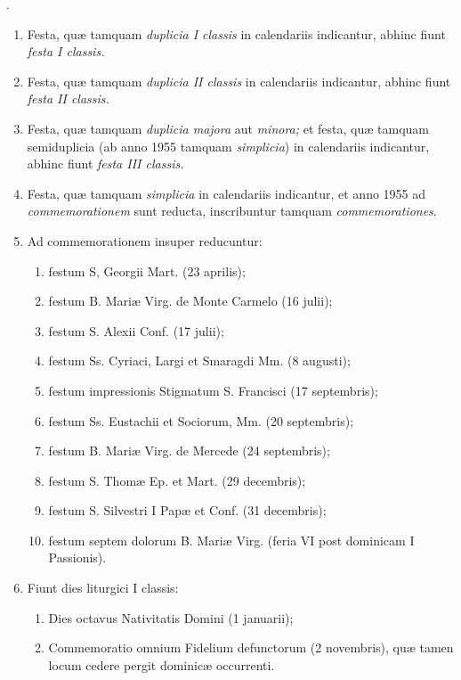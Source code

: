 \documentclass[vesperale_romanum.tex]{subfiles}
\begin{document}
.

\begin{enumerate}[nosep]
\item Festa, quæ tamquam \textit{duplicia I classis} in calendariis indicantur, abhinc fiunt \textit{festa I classis.}

\item Festa, quæ tamquam \textit{duplicia II classis} in calendariis indicantur, abhinc fiunt \textit{festa II classis.}

\item Festa, quæ tamquam \textit{duplicia majora} aut \textit{minora;} et festa, quæ tamquam semiduplicia (ab anno 1955 tamquam \textit{simplicia}) in calendariis indicantur, abhinc fiunt \textit{festa III classis.}

\item Festa, quæ tamquam \textit{simplicia} in calendariis indicantur, et anno 1955 ad \textit{commemorationem} sunt reducta, inscribuntur tamquam \textit{commemorationes}.

\item Ad commemorationem insuper reducuntur:
\begin{enumerate}[nosep,label=\alph*.]
\item festum S, Georgii Mart. (23 aprilis);
\item festum B. Mariæ Virg. de Monte Carmelo (16 julii);
\item festum S. Alexii Conf. (17 julii);
\item festum Ss. Cyriaci, Largi et Smaragdi Mm. (8 augusti);
\item festum impressionis Stigmatum S. Francisci (17 septembris);
\item festum Ss. Eustachii et Sociorum, Mm. (20 septembris);
\item festum B. Mariæ Virg. de Mercede (24 septembris);
\item festum S. Thomæ Ep. et Mart. (29 decembris);
\item festum S. Silvestri I Papæ et Conf. (31 decembris);
\item festum septem dolorum B. Mariæ Virg. (feria VI post dominicam I Passionis).
\end{enumerate}

\item Fiunt dies liturgici I classis:
\begin{enumerate}[nosep,label=\alph*.]
\item
Dies octavus Nativitatis Domini (1 januarii);
\item
 Commemoratio omnium Fidelium defunctorum (2 novembris),
quæ tamen locum cedere pergit dominicæ occurrenti.
\end{enumerate}


\end{enumerate}
\end{document}
